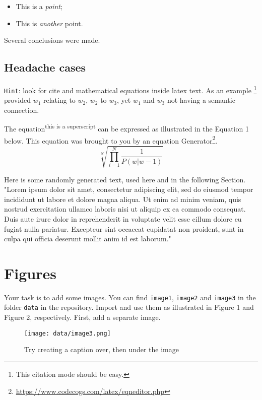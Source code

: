 \documentclass[wide]{cluu}
\begin{document}
\begin{itemize}[noitemsep=0mm,topsep=0mm]
\item This is a \textit{point};
\item This is \textit{another} point.
\end{itemize}
Several conclusions were made.
\subsection{Headache cases}
\texttt{Hint}: look for cite and mathematical equations inside latex text.
\newline
\newline
As an example \cite{tversky1982similarity}\footnote{This citation mode should be easy.} provided \( w_1 \) relating to \( w_2 \), \( w_2 \) to \( w_3 \), yet \( w_1 \) and \( w_3 \) not having a semantic connection. 

\newline
\newline
The equation\textsuperscript{this is a superscript} can be expressed as illustrated in the Equation 1 below. This equation was brought to you by an equation Generator\footnote{\url{https://www.codecogs.com/latex/eqneditor.php}}.
\begin{equation}
\sqrt[N]{\prod_{i=1}^{N}\frac{1}{P({w|w-1})}}
\end{equation}

Here is some randomly generated text, used here and in the following Section. "Lorem ipsum dolor sit amet, consectetur adipiscing elit, sed do eiusmod tempor incididunt ut labore et dolore magna aliqua. Ut enim ad minim veniam, quis nostrud exercitation ullamco laboris nisi ut aliquip ex ea commodo consequat. Duis aute irure dolor in reprehenderit in voluptate velit esse cillum dolore eu fugiat nulla pariatur. Excepteur sint occaecat cupidatat non proident, sunt in culpa qui officia deserunt mollit anim id est laborum."


\section{Figures}

Your task is to add some images. You can find \texttt{image1},  \texttt{image2} and \texttt{image3} in the folder \texttt{data} in the repository. Import and use them as illustrated in Figure 1 and Figure 2, respectively. First, add a separate image. 
\begin{figure}[ht!]
    \centering
    \caption{Try creating a caption over, then under the image}
    \texttt{[image: data/image3.png]}
    \label{fig:my_label}
\end{figure}
\end{document}
